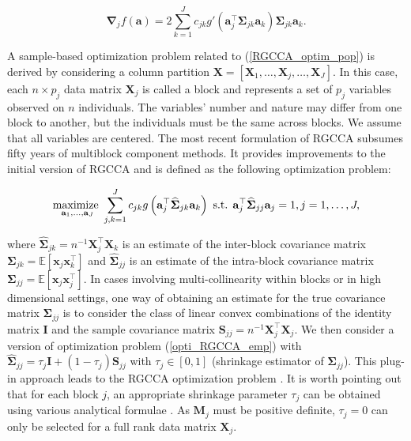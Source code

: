\documentclass[
]{jss}
\begin{document}
\begin{equation}
 \mathbf \nabla_j f( \mathbf a)=2\sum_{k=1}^{J}c_{jk}g'\left( \mathbf a_j^\top  \mathbf \Sigma_{jk}  \mathbf a_k \right)  \mathbf \Sigma_{jk}  \mathbf a_k.
\label{grad_obj_function}
\end{equation}

A sample-based optimization problem related to (\ref{RGCCA_optim_pop})
is derived by considering a column partition
\(\mathbf X = [\mathbf X_1, \ldots, \mathbf X_j, \ldots, \mathbf X_J]\).
In this case, each \(n \times p_j\) data matrix \(\mathbf X_j\) is
called a block and represents a set of \(p_j\) variables observed on
\(n\) individuals. The variables' number and nature may differ from one
block to another, but the individuals must be the same across blocks. We
assume that all variables are centered. The most recent formulation of
RGCCA \citep{Tenenhaus2017} subsumes fifty years of multiblock component
methods. It provides improvements to the initial version of RGCCA
\citep{Tenenhaus2011} and is defined as the following optimization
problem:

\begin{equation}
\underset{ \mathbf a_1, \ldots,  \mathbf a_J}{\text{maximize }}
\sum_{j, k = 1}^J c_{jk} g\left( \mathbf a_j^\top
\widehat{\mathbf{\Sigma}}_{jk} \mathbf a_k \right)\\ \text{ s.t. } \mathbf a_j^\top\widehat{\mathbf{\Sigma}}_{jj} \mathbf a_j=1, j =1, \ldots, J,
\label{opti_RGCCA_emp}
\end{equation}

where
\(\widehat{\mathbf{\Sigma}}_{jk} = n^{-1} \mathbf X_j^\top \mathbf X_k\)
is an estimate of the inter-block covariance matrix
\(\mathbf{\Sigma}_{jk}= \mathbb{E}[\boldsymbol x_j\boldsymbol x_k^\top]\)
and \(\widehat{\mathbf{\Sigma}}_{jj}\) is an estimate of the intra-block
covariance matrix
\(\mathbf{\Sigma}_{jj} = \mathbb{E}[\boldsymbol x_j\boldsymbol x_j^\top]\).
In cases involving multi-collinearity within blocks or in high
dimensional settings, one way of obtaining an estimate for the true
covariance matrix \(\mathbf{\Sigma}_{jj}\) is to consider the class of
linear convex combinations of the identity matrix \(\mathbf I\) and the
sample covariance matrix
\(\mathbf{S}_{jj} = n^{-1} \mathbf X_j^\top \mathbf X_j\). We then
consider a version of optimization problem (\ref{opti_RGCCA_emp}) with
\(\widehat{\mathbf{\Sigma}}_{jj} = \tau_j\mathbf{I} + (1-\tau_j)\mathbf{S}_{jj}\)
with \(\tau_j \in [0,1]\) (shrinkage estimator of
\(\mathbf{\Sigma}_{jj}\)). This plug-in approach leads to the RGCCA
optimization problem \citep{Tenenhaus2011}. It is worth pointing out
that for each block \(j\), an appropriate shrinkage parameter \(\tau_j\)
can be obtained using various analytical formulae
\citep[see][for instance]{Ledoit2004, Schafer2005, Chen2011}. As
\(\mathbf{M}_j\) must be positive definite, \(\tau_j = 0\) can only be
selected for a full rank data matrix \(\mathbf{X}_j\).
\end{document}
